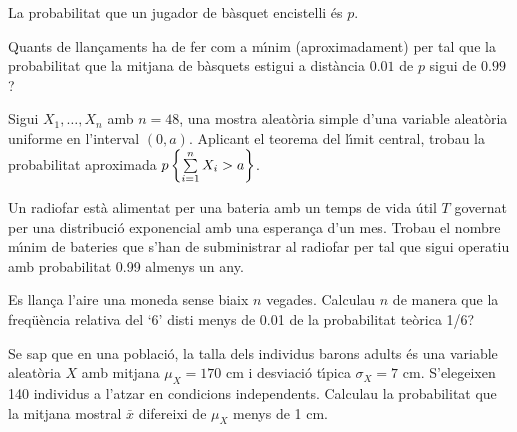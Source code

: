 \begin{prob}
{
La probabilitat que un jugador de b\`asquet encistelli \'es $p$.

Quants de llan\c{c}aments ha de fer com a m\'{\i}nim (aproximadament) 
per tal 
que la probabilitat que la mitjana de b\`asquets estigui a dist\`ancia 
$0.01$ de $p$ sigui de $0.99$?
}
\end{prob}

\begin{prob}
{
Sigui $X_1,\ldots,X_{n}$ amb $n=48$, una mostra aleat\`oria simple d'una 
variable aleat\`oria uniforme en l'interval $(0,a)$.
Aplicant el teorema del l\'{\i}mit central, trobau la probabilitat 
aproximada $p\left\{\sum\limits_{i=1}^n X_i >a\right\}$.
}
\end{prob}

\begin{prob} {Un radiofar est\`a alimentat per una bateria amb un temps de vida
\'util $T$ governat per una distribuci\'o exponencial amb una esperan\c{c}a d'un
mes. Trobau el nombre m\'{\i}nim de bateries que s'han de subministrar al
radiofar per tal que sigui operatiu amb probabilitat 0.99 almenys un any.}
\end{prob}

\begin{prob} {Es llan\c{c}a l'aire una moneda sense biaix $n$ vegades. Calculau
$n$ de manera que la freq\"u\`encia relativa del `6' disti menys de 0.01 de la
probabilitat te\`orica 1/6?} \end{prob}

\begin{prob} {Se sap que en una poblaci\'o, la talla dels individus barons adults
\'es una variable aleat\`oria $X$ amb mitjana $\mu_X = 170$ cm i desviaci\'o
t\'{\i}pica $\sigma_X = 7$ cm. S'elegeixen 140 individus a l'atzar en condicions
independents. Calculau la probabilitat que la mitjana mostral $\bar{x}$
difereixi de $\mu_X$ menys de 1 cm.} \end{prob}

